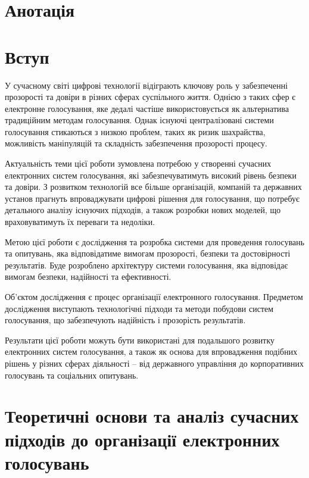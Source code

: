 \documentclass[14pt]{extreport}
\begin{document}
  \chapter*{Анотація}
  
  \tableofcontents
  \newpage
  
  \chapter*{Вступ}
  
  У сучасному світі цифрові технології відіграють ключову роль у забезпеченні прозорості та довіри в різних сферах суспільного життя. Однією з таких сфер є електронне голосування, яке дедалі частіше використовується як альтернатива традиційним методам голосування. Однак існуючі централізовані системи голосування стикаються з низкою проблем, таких як ризик шахрайства, можливість маніпуляцій та складність забезпечення прозорості процесу.

  Актуальність теми цієї роботи зумовлена потребою у створенні сучасних електронних систем голосування, які забезпечуватимуть високий рівень безпеки та довіри. З розвитком технологій все більше організацій, компаній та державних установ прагнуть впроваджувати цифрові рішення для голосування, що потребує детального аналізу існуючих підходів, а також розробки нових моделей, що враховуватимуть їх переваги та недоліки.

  Метою цієї роботи є дослідження та розробка системи для проведення голосувань та опитувань, яка відповідатиме вимогам прозорості, безпеки та достовірності результатів. Буде розроблено архітектуру системи голосування, яка відповідає вимогам безпеки, надійності та ефективності.

  Об’єктом дослідження є процес організації електронного голосування. Предметом дослідження виступають технологічні підходи та методи побудови систем голосування, що забезпечують надійність і прозорість результатів.

  Результати цієї роботи можуть бути використані для подальшого розвитку електронних систем голосування, а також як основа для впровадження подібних рішень у різних сферах діяльності – від державного управління до корпоративних голосувань та соціальних опитувань.
  
  \chapter{Теоретичні основи та аналіз сучасних підходів до організації електронних голосувань}
  
\end{document}
